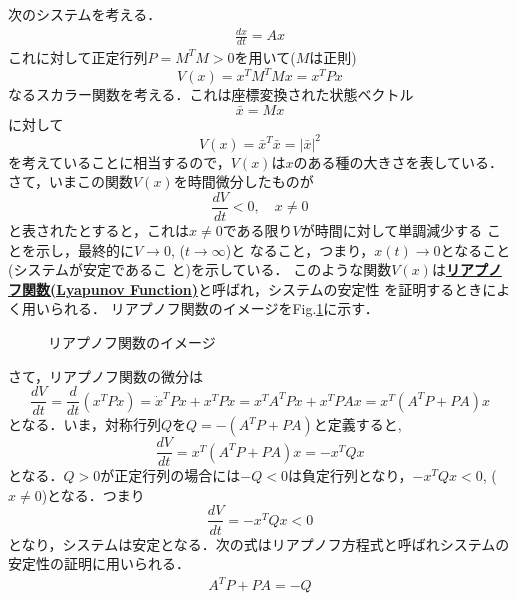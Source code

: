 \noindent
次のシステムを考える．
\begin{eqnarray}
	\frac{d x}{dt} = A x
\end{eqnarray}
これに対して正定行列$P=M^T M>0$を用いて($M$は正則)
\begin{equation}
 V(x) = x^T M^T M x = x^T P x
\end{equation}
なるスカラー関数を考える．これは座標変換された状態ベクトル
\begin{equation}
 \bar{x} = M x
\end{equation}
に対して
\begin{equation}
 V(x) = \bar{x}^T \bar{x} = \vert \bar{x} \vert ^2
\end{equation}
を考えていることに相当するので，$V(x)$は$x$のある種の大きさを表している．
さて，いまこの関数$V(x)$を時間微分したものが
\begin{equation}
 \frac{d V}{d t} < 0, \quad x \neq 0
  \label{lyapunov_1D}
\end{equation}
と表されたとすると，これは$x \neq 0$である限り$V$が時間に対して単調減少する
ことを示し，最終的に$ V \rightarrow 0$, ($t \rightarrow \infty$)と
なること，つまり，$x(t) \rightarrow 0$となること(システムが安定であるこ
と)を示している．
このような関数$V(x)$は{\bf \underline{リアプノフ関数(Lyapunov Function)}}と呼ばれ，システムの安定性
を証明するときによく用いられる．
リアプノフ関数のイメージをFig.\ref{fig:lyapunovD}に示す．

\begin{figure}[htbp]
 \begin{center}
  \caption{リアプノフ関数のイメージ}
  \label{fig:lyapunovD}
 \end{center}
\end{figure}

さて，リアプノフ関数の微分は
\begin{equation}
 \frac{d V}{d t} = \frac{d}{dt} (x^T P x) = \dot{x}^T P x + x^T P \dot{x} = x^T A^T P x + x^T P A x = x^T (A^T P + P A) x
\label{Lyapunov_d}
\end{equation}
となる．いま，対称行列$Q$を$Q=-(A^T P + P A)$と定義すると,
\begin{equation}
 \frac{d V}{d t} = x^T (A^T P + P A) x = -x^T Q x
\label{lyapunov_Q}
\end{equation}
となる．$Q>0$が正定行列の場合には$-Q<0$は負定行列となり，$- x^T Q x < 0 $, ($x \neq 0$)となる．つまり
\begin{equation}
 \frac{d V}{d t} = - x^T Q x<0
\label{Lyapunov_d2}
\end{equation}
となり，システムは安定となる．次の式はリアプノフ方程式と呼ばれシステムの安定性の証明に用いられる．
\begin{eqnarray}
	A^T P + P A = - Q
\label{Lyapunov_eq}
\end{eqnarray}

